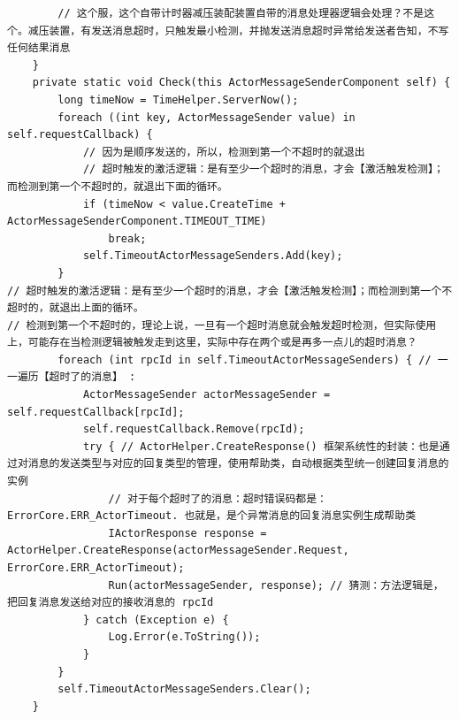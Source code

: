 \documentclass[9pt, b5paper]{article}
\begin{document}
\begin{itemize}
\begin{verbatim}
        // 这个服，这个自带计时器减压装配装置自带的消息处理器逻辑会处理？不是这个。减压装置，有发送消息超时，只触发最小检测，并抛发送消息超时异常给发送者告知，不写任何结果消息 
    }
    private static void Check(this ActorMessageSenderComponent self) {
        long timeNow = TimeHelper.ServerNow();
        foreach ((int key, ActorMessageSender value) in self.requestCallback) {
            // 因为是顺序发送的，所以，检测到第一个不超时的就退出
            // 超时触发的激活逻辑：是有至少一个超时的消息，才会【激活触发检测】；而检测到第一个不超时的，就退出下面的循环。
            if (timeNow < value.CreateTime + ActorMessageSenderComponent.TIMEOUT_TIME) 
                break;
            self.TimeoutActorMessageSenders.Add(key);
        }
// 超时触发的激活逻辑：是有至少一个超时的消息，才会【激活触发检测】；而检测到第一个不超时的，就退出上面的循环。
// 检测到第一个不超时的，理论上说，一旦有一个超时消息就会触发超时检测，但实际使用上，可能存在当检测逻辑被触发走到这里，实际中存在两个或是再多一点儿的超时消息？
        foreach (int rpcId in self.TimeoutActorMessageSenders) { // 一一遍历【超时了的消息】 :
            ActorMessageSender actorMessageSender = self.requestCallback[rpcId];
            self.requestCallback.Remove(rpcId);
            try { // ActorHelper.CreateResponse() 框架系统性的封装：也是通过对消息的发送类型与对应的回复类型的管理，使用帮助类，自动根据类型统一创建回复消息的实例
                // 对于每个超时了的消息：超时错误码都是：ErrorCore.ERR_ActorTimeout. 也就是，是个异常消息的回复消息实例生成帮助类
                IActorResponse response = ActorHelper.CreateResponse(actorMessageSender.Request, ErrorCore.ERR_ActorTimeout);
                Run(actorMessageSender, response); // 猜测：方法逻辑是，把回复消息发送给对应的接收消息的 rpcId
            } catch (Exception e) {
                Log.Error(e.ToString());
            }
        }
        self.TimeoutActorMessageSenders.Clear();
    }


\end{verbatim}
\end{itemize}
\end{document}

